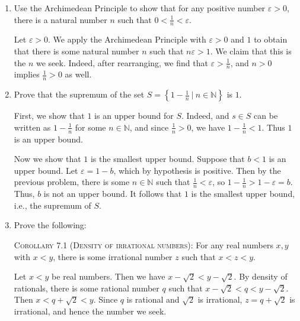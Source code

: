 \documentclass[12pt]{amsart}
\def\ds{\displaystyle}
\def\e{\varepsilon}
\newcommand{\N}{\mathbb{N}}
\numberwithin{equation}{section}
\theoremstyle{plain} %
\theoremstyle{definition}
\theoremstyle{remark}
\begin{document}
\begin{enumerate}


\item Use the Archimedean Principle to show that for any positive number $\e>0$, there is a natural number $n$ such that $\ds 0 < \frac{1}{n} < \e$.



\begin{framed} Let $\e>0$. We apply the Archimedean Principle with $\e>0$ and $1$ to obtain that there is some natural number $n$ such that $n \e >1$. We claim that this is the $n$ we seek. Indeed, after rearranging, we find that $\ds \e > \frac{1}{n}$, and $n>0$ implies $\ds \frac{1}{n}>0$ as well. 
\end{framed}

\item Prove that the supremum of the set $\ds S= \left\{ 1 - \frac1n \ | \ n\in \N\right\}$ is $1$.

\begin{framed} First, we show that $1$ is an upper bound for $S$. Indeed, and $s\in S$ can be written as $1-\frac{1}{n}$ for some $n\in \N$, and since $\frac{1}{n}>0$, we have $1-\frac{1}{n} < 1$. Thus $1$ is an upper bound.

Now we show that $1$ is the smallest upper bound. Suppose that $b<1$ is an upper bound. Let $\e = 1 - b$, which by hypothesis is positive. Then by the previous problem, there is some $n\in \N$ such that $\frac{1}{n} < \e$, so $1-\frac{1}{n} > 1 - \e = b$. Thus, $b$ is not an upper bound. It follows that $1$ is the smallest upper bound, i.e., the supremum of $S$.
\end{framed}




\item Prove the following:
\begin{framed}
\noindent \textsc{Corollary 7.1 (Density of irrational numbers):} For any real numbers $x,y$ with $x<y$, there is some irrational number $z$ such that $x<z<y$.
\end{framed}

 \begin{framed}
Let $x<y$ be real numbers. Then we have $x-\sqrt{2} < y-\sqrt{2}$. By density of rationals, there is some rational number $q$ such that $x-\sqrt{2} < q < y-\sqrt{2}$. Then $x < q + \sqrt{2} < y$. Since $q$ is rational and $\sqrt{2}$ is irrational, $z=q+\sqrt{2}$ is irrational, and hence the number we seek.
\end{framed}



\end{enumerate}
\end{document}
